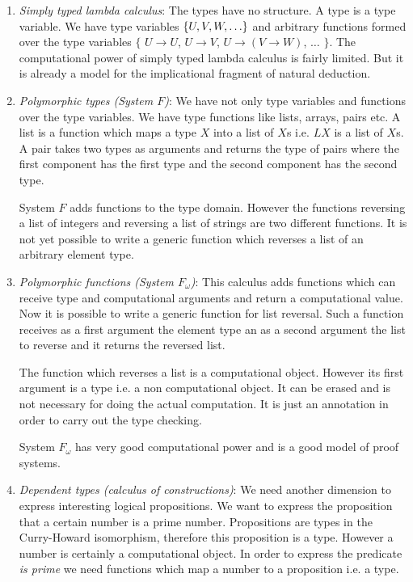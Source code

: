 \begin{enumerate}

\item \emph{Simply typed lambda calculus}: The types have no structure. A type
is a type variable. We have type variables ${\{U, V, W, \ldots\}}$ and arbitrary
functions formed over the type variables $\{$ $U \to U$, $U \to V$, $U \to (V \to
W)$, $\ldots$ $\}$. The computational power of simply typed lambda calculus is fairly
limited. But it is already a model for the implicational fragment of natural
deduction.

\item \emph{Polymorphic types (System $F$)}: We have not only type variables and
functions over the type variables. We have type functions like lists, arrays,
pairs etc. A list is a function which maps a type $X$ into a list of $X$s i.e.
$L X$ is a list of $X$s. A pair takes two types as arguments and returns the
type of pairs where the first component has the first type and the second
component has the second type.

System $F$ adds functions to the type domain. However the  functions reversing a
list of integers and reversing a list of strings are two different functions. It
is not yet possible to write a generic function which reverses a list of an
arbitrary element type.

\item \emph{Polymorphic functions (System $F_\omega$)}: This calculus adds
functions which can receive type and computational arguments and return a
computational value. Now it is possible to write a generic function for list
reversal. Such a function receives as a first argument the element type an as a
second argument the list to reverse and it returns the reversed list.

The function which reverses a list is a computational object. However its first
argument is a type i.e. a non computational object. It can be erased and is not
necessary for doing the actual computation. It is just an annotation in order to
carry out the type checking.

System $F_\omega$ has very good computational power and is a good model of proof
systems.

\item \emph{Dependent types (calculus of constructions)}: We need another
dimension to express interesting logical propositions. We want to express the
proposition that a certain number is a prime number. Propositions are types in
the Curry-Howard isomorphism, therefore this proposition is a type. However a
number is certainly a computational object. In order to express the predicate
\emph{is prime} we need functions which map a number to a proposition i.e. a
type.


\end{enumerate}
